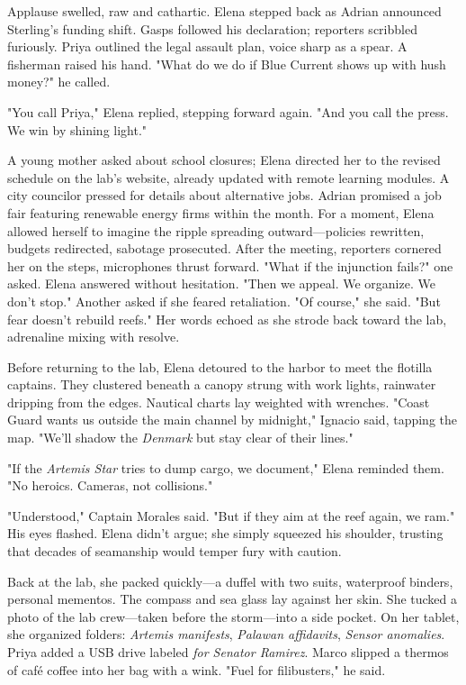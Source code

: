 Applause swelled, raw and cathartic. Elena stepped back as Adrian announced Sterling's funding shift. Gasps followed his declaration; reporters scribbled furiously. Priya outlined the legal assault plan, voice sharp as a spear. A fisherman raised his hand. "What do we do if Blue Current shows up with hush money?" he called.

"You call Priya," Elena replied, stepping forward again. "And you call the press. We win by shining light."

A young mother asked about school closures; Elena directed her to the revised schedule on the lab's website, already updated with remote learning modules. A city councilor pressed for details about alternative jobs. Adrian promised a job fair featuring renewable energy firms within the month. For a moment, Elena allowed herself to imagine the ripple spreading outward—policies rewritten, budgets redirected, sabotage prosecuted. After the meeting, reporters cornered her on the steps, microphones thrust forward. "What if the injunction fails?" one asked. Elena answered without hesitation. "Then we appeal. We organize. We don't stop." Another asked if she feared retaliation. "Of course," she said. "But fear doesn't rebuild reefs." Her words echoed as she strode back toward the lab, adrenaline mixing with resolve.

\bigskip

Before returning to the lab, Elena detoured to the harbor to meet the flotilla captains. They clustered beneath a canopy strung with work lights, rainwater dripping from the edges. Nautical charts lay weighted with wrenches. "Coast Guard wants us outside the main channel by midnight," Ignacio said, tapping the map. "We'll shadow the \textit{Denmark} but stay clear of their lines."

"If the \textit{Artemis Star} tries to dump cargo, we document," Elena reminded them. "No heroics. Cameras, not collisions."

"Understood," Captain Morales said. "But if they aim at the reef again, we ram." His eyes flashed. Elena didn't argue; she simply squeezed his shoulder, trusting that decades of seamanship would temper fury with caution.

Back at the lab, she packed quickly—a duffel with two suits, waterproof binders, personal mementos. The compass and sea glass lay against her skin. She tucked a photo of the lab crew—taken before the storm—into a side pocket. On her tablet, she organized folders: \textit{Artemis manifests}, \textit{Palawan affidavits}, \textit{Sensor anomalies}. Priya added a USB drive labeled \textit{for Senator Ramirez}. Marco slipped a thermos of café coffee into her bag with a wink. "Fuel for filibusters," he said.


